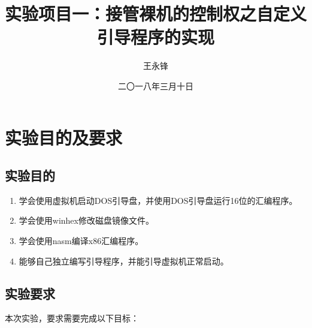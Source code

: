 \documentclass[forprint]{WHUBachelor}
\begin{document}

\title{实验项目一：接管裸机的控制权之自定义引导程序的实现}
\author{王永锋}                            %
\date{二〇一八年三月十日}                    %

\maketitle
\frontmatter
{}              %
\tableofcontents
\mainmatter %
\chapter{实验目的及要求}

\section{实验目的}

\begin{enumerate}
  \item 学会使用虚拟机启动DOS引导盘，并使用DOS引导盘运行16位的汇编程序。
  \item 学会使用winhex修改磁盘镜像文件。
  \item 学会使用nasm编译x86汇编程序。
  \item 能够自己独立编写引导程序，并能引导虚拟机正常启动。
\end{enumerate}

\section{实验要求}

本次实验，要求需要完成以下目标：\\
\end{document}
